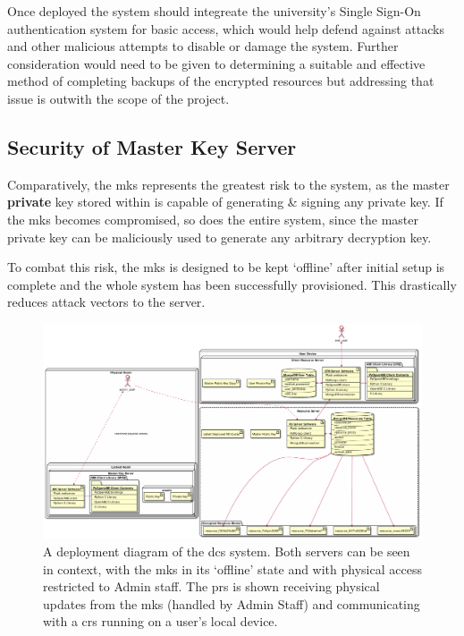 Once deployed the system should integreate the university's Single Sign-On authentication system for basic access, which would help defend against attacks and other malicious attempts to disable or damage the system. Further consideration would need to be given to determining a suitable and effective method of completing backups of the encrypted resources but addressing that issue is outwith the scope of the project.

\subsection{Security of Master Key Server}
\label{subsec:analysis_deployment_mks}

Comparatively, the \acrfull{mks} represents the greatest risk to the \theResServer system, as the master \textbf{private} key stored within is capable of generating \& signing any private key. If the \acrshort{mks} becomes compromised, so does the entire system, since the master private key can be maliciously used to generate any arbitrary decryption key.

To combat this risk, the \acrshort{mks} is designed to be kept `offline' after initial setup is complete and the whole system has been successfully provisioned. This drastically reduces attack vectors to the server.

\begin{figure}[htp]
    \includegraphics[width=\linewidth,keepaspectratio]{images/infrastructure/deployment.pdf}

    \caption{A deployment diagram of the \acrshort{dcs} \theResServer system. Both servers can be seen in context, with the \acrfull{mks} in its `offline' state and with physical access restricted to Admin staff. The \acrlong{prs} is shown receiving physical updates from the \acrshort{mks} (handled by Admin Staff) and communicating with a \acrlong{crs} running on a user's local device.}

    \label{fig:deployment_diagram}
\end{figure}

